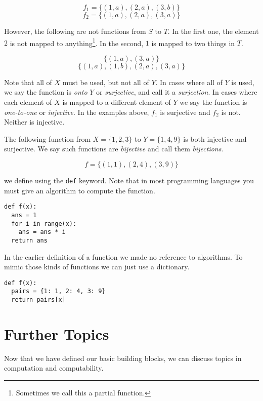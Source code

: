 \documentclass{iansnotes}
\begin{document}
  \[ f_1 = \{ (1, a), (2, a), (3, b) \} \]
  \[ f_2 = \{ (1, a), (2, a), (3, a) \} \]

  However, the following are not functions from $S$ to $T$.
  In the first one, the element $2$ is not mapped to anything\footnote{Sometimes we call this a partial function.}.
  In the second, $1$ is mapped to two things in $T$.

  \[ \{ (1, a), (3, a) \} \]
  \[ \{ (1, a), (1, b), (2, a), (3, a) \} \]

  Note that all of $X$ must be used, but not all of $Y$.
  In cases where all of $Y$ is used, we say the function is \emph{onto} $Y$ or \emph{surjective}, and call it a \emph{surjection}.
  In cases where each element of $X$ is mapped to a different element of $Y$ we say the function is \emph{one-to-one} or \emph{injective}.
  In the examples above, $f_1$ is surjective and $f_2$ is not.
  Neither is injective.

  The following function from $X = \{1, 2, 3\}$ to $Y = \{1, 4, 9\}$ is both injective and surjective.
  We say such functions are \emph{bijective} and call them \emph{bijections}.

  \[ f = \{(1,1), (2,4), (3,9) \} \]
  
   we define using the \texttt{def} keyword.
  Note that in most programming languages you must give an algorithm to compute the function.
  \begin{verbatim}
def f(x):
  ans = 1
  for i in range(x):
    ans = ans * i
  return ans
  \end{verbatim}
  In the earlier definition of a function we made no reference to algorithms.
  To mimic those kinds of functions we can just use a dictionary.
  \begin{verbatim}
def f(x):
  pairs = {1: 1, 2: 4, 3: 9}
  return pairs[x]
  \end{verbatim}

\section{Further Topics}
  Now that we have defined our basic building blocks, we can discuss topics in computation and computability.
\end{document}
